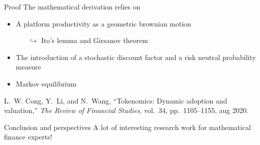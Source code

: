 \documentclass{beamer}
\begin{document}
\begin{frame}{Proof}
\scriptsize
The mathematical derivation relies on 
\begin{itemize}
  \item A platform productivity as a geometric brownian motion
  \begin{itemize}
    \item[$\hookrightarrow$] \tiny Ito's lemma and Girsanov theorem
  \end{itemize}
  \item The introduction of a stochastic discount factor and a risk neutral probability measure
  \item Markov equilibrium
\end{itemize}

\begin{thebibliography}{1}

L.~W. Cong, Y.~Li, and N.~Wang, ``Tokenomics: Dynamic adoption and valuation,''
  {\em The Review of Financial Studies}, vol.~34, pp.~1105--1155, aug 2020.

\end{thebibliography}

\end{frame}
\begin{frame}{Conclusion and perspectives}
A lot of interesting research work for mathematical finance experts!
\end{frame}
\end{document}
